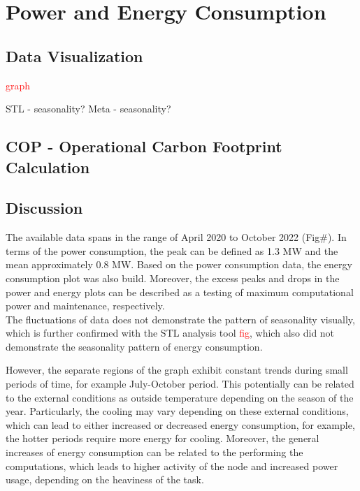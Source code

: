 \section{Power and Energy Consumption}
\noindent

\subsection{Data Visualization}
\textcolor{red}{graph}

STL - seasonality?
Meta - seasonality?

\subsection{COP - Operational Carbon Footprint Calculation}

\subsection{Discussion}
The available data spans in the range of April 2020 to October 2022 (Fig\#). In terms of the power consumption, the peak can be defined as 1.3 MW and the mean approximately 0.8 MW. Based on the power consumption data, the energy consumption plot was also build. Moreover, the excess peaks and drops in the power and energy plots can be described as a testing of maximum computational power and maintenance, respectively.  \\
The fluctuations of data does not demonstrate the pattern of seasonality visually, which is further confirmed with the STL analysis tool \textcolor{red}{fig}, which also did not demonstrate the seasonality pattern of energy consumption. 

However, the separate regions of the graph exhibit constant trends during small periods of time, for example July-October period. This potentially can be related to the external conditions as outside temperature depending on the season of the year. Particularly, the cooling may vary depending on these external conditions, which can lead to either increased or decreased energy consumption, for example, the hotter periods require more energy for cooling. Moreover, the general increases of energy consumption can be related to the performing the computations, which leads to higher activity of the node and increased power usage, depending on the heaviness of the task. 

